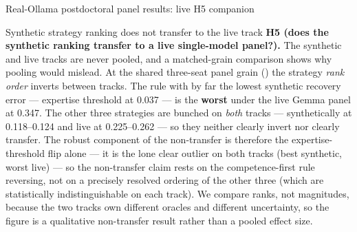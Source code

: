 \documentclass[
  ignorenonframetext,
]{beamer}
\begin{document}
\begin{frame}{Real-Ollama postdoctoral panel
results: live H5 companion}
\begin{block}{Synthetic strategy ranking does not transfer to the live
track}
\protect{}\label{synthetic-strategy-ranking-does-not-transfer-to-the-live-track}
\textbf{H5 (does the synthetic ranking transfer to a live single-model
panel?).} The synthetic and live tracks are never pooled, and a
matched-grain comparison shows why pooling would mislead. At the shared
three-seat panel grain () the strategy
\emph{rank order} inverts between tracks. The rule with by far the
lowest synthetic recovery error --- expertise threshold at 0.037 --- is
the \textbf{worst} under the live Gemma panel at 0.347. The other three
strategies are bunched on \emph{both} tracks --- synthetically at
0.118--0.124 and live at 0.225--0.262 --- so they neither clearly invert
nor clearly transfer. The robust component of the non-transfer is
therefore the expertise-threshold flip alone --- it is the lone clear
outlier on both tracks (best synthetic, worst live) --- so the
non-transfer claim rests on the competence-first rule reversing, not on
a precisely resolved ordering of the other three (which are
statistically indistinguishable on each track). We compare ranks, not
magnitudes, because the two tracks own different oracles and different
uncertainty, so the figure is a qualitative non-transfer result rather
than a pooled effect size.


\end{block}
\end{frame}
\end{document}
